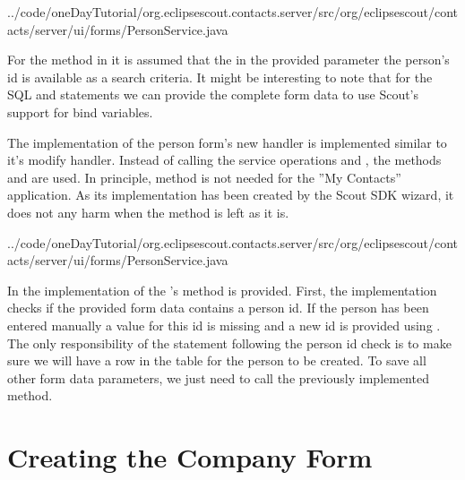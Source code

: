 \documentclass[a4paper,10pt,twoside]{book}
\begin{document}

{../code/oneDayTutorial/org.eclipsescout.contacts.server/src/org/eclipsescout/contacts/server/ui/forms/PersonService.java}

For the  method in  it is assumed that the in the provided parameter  the person's id is available as a search criteria. 
It might be interesting to note that for the SQL  and  statements we can provide the complete form data to use Scout's support for bind variables. 

The implementation of the person form's new handler is implemented similar to it's modify handler. 
Instead of calling the service operations  and , the methods   and  are used. 
In principle, method  is not needed for the ''My Contacts'' application. 
As its implementation has been created by the Scout SDK wizard, it does not any harm when the method is left as it is. 


{../code/oneDayTutorial/org.eclipsescout.contacts.server/src/org/eclipsescout/contacts/server/ui/forms/PersonService.java}

In  the implementation of the 's  method is provided. 
First, the implementation checks if the provided form data contains a person id. 
If the person has been entered manually a value for this id is missing and a new id is provided using .
The only responsibility of the  statement following the person id check is to make sure we will have a row in the  table for the person to be created. 
To save all other form data parameters, we just need to call the previously implemented  method. 


\section{Creating the Company Form}
\end{document}
